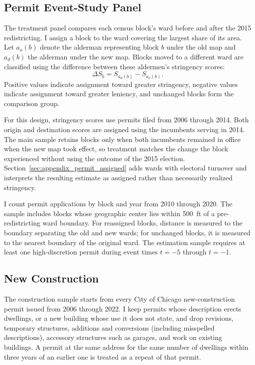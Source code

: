 \subsection{Permit Event-Study Panel}
\label{subsec:event_study_panel}

The treatment panel compares each census block's ward before and after the 2015 redistricting.
I assign a block to the ward covering the largest share of its area.
Let $a_o(b)$ denote the alderman representing block $b$ under the old map and $a_d(b)$ the alderman under the new map.
Blocks moved to a different ward are classified using the difference between these aldermen's stringency scores:
\[
\Delta S_b = S_{a_d(b)} - S_{a_o(b)}.
\]
Positive values indicate assignment toward greater stringency, negative values indicate assignment toward greater leniency, and unchanged blocks form the comparison group.

For this design, stringency scores use permits filed from 2006 through 2014.
Both origin and destination scores are assigned using the incumbents serving in 2014.
The main sample retains blocks only when both incumbents remained in office when the new map took effect, so treatment matches the change the block experienced without using the outcome of the 2015 election.
Section~\ref{sec:appendix_permit_assigned} adds wards with electoral turnover and interprets the resulting estimate as assigned rather than necessarily realized stringency.

I count permit applications by block and year from 2010 through 2020.
The sample includes blocks whose geographic center lies within 500~ft of a pre-redistricting ward boundary.
For reassigned blocks, distance is measured to the boundary separating the old and new wards; for unchanged blocks, it is measured to the nearest boundary of the original ward.
The estimation sample requires at least one high-discretion permit during event times $t=-5$ through $t=-1$.

\subsection{New Construction}
\label{subsec:new_construction_sample}

The construction sample starts from every City of Chicago new-construction permit issued from 2006 through 2022.
I keep permits whose description erects dwellings, or a new building whose use it does not state, and drop revisions, temporary structures, additions and conversions (including misspelled descriptions), accessory structures such as garages, and work on existing buildings.
A permit at the same address for the same number of dwellings within three years of an earlier one is treated as a repeat of that permit.

